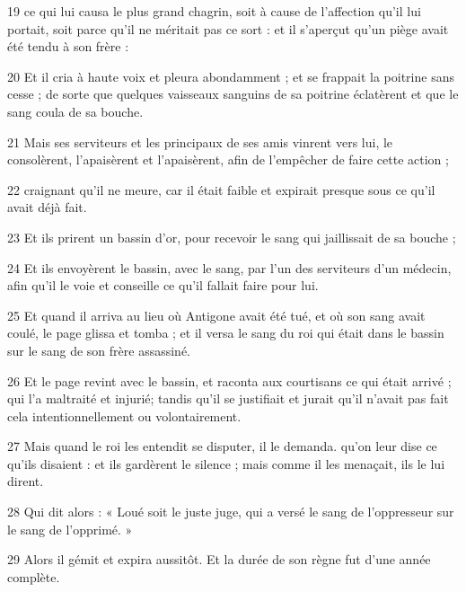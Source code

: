 \par 19 ce qui lui causa le plus grand chagrin, soit à cause de l'affection qu'il lui portait, soit parce qu'il ne méritait pas ce sort : et il s'aperçut qu'un piège avait été tendu à son frère :

\par 20 Et il cria à haute voix et pleura abondamment ; et se frappait la poitrine sans cesse ; de sorte que quelques vaisseaux sanguins de sa poitrine éclatèrent et que le sang coula de sa bouche.

\par 21 Mais ses serviteurs et les principaux de ses amis vinrent vers lui, le consolèrent, l'apaisèrent et l'apaisèrent, afin de l'empêcher de faire cette action ;

\par 22 craignant qu'il ne meure, car il était faible et expirait presque sous ce qu'il avait déjà fait.

\par 23 Et ils prirent un bassin d'or, pour recevoir le sang qui jaillissait de sa bouche ;

\par 24 Et ils envoyèrent le bassin, avec le sang, par l'un des serviteurs d'un médecin, afin qu'il le voie et conseille ce qu'il fallait faire pour lui.

\par 25 Et quand il arriva au lieu où Antigone avait été tué, et où son sang avait coulé, le page glissa et tomba ; et il versa le sang du roi qui était dans le bassin sur le sang de son frère assassiné.

\par 26 Et le page revint avec le bassin, et raconta aux courtisans ce qui était arrivé ; qui l'a maltraité et injurié; tandis qu'il se justifiait et jurait qu'il n'avait pas fait cela intentionnellement ou volontairement.

\par 27 Mais quand le roi les entendit se disputer, il le demanda. qu'on leur dise ce qu'ils disaient : et ils gardèrent le silence ; mais comme il les menaçait, ils le lui dirent.

\par 28 Qui dit alors : « Loué soit le juste juge, qui a versé le sang de l'oppresseur sur le sang de l'opprimé. »

\par 29 Alors il gémit et expira aussitôt. Et la durée de son règne fut d'une année complète.

